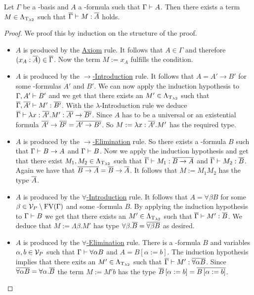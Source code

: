 \begin{lemma}\label{l1}
Let $\Gamma$ be a \SysP-basis and $A$ a \SysP-formula such that $\Gamma\vdash A$. Then there exists a term $M\in\Lambda_{\text{T}_{\lambda2}}$ such that $\overline{\Gamma}\vdash M:\overline{A}$ holds.
\end{lemma}
\begin{proof}
We proof this by induction on the structure of the proof. %

\begin{itemize}
	\item[] $A$ is produced by the \underline{Axiom} rule. It follows that $A\in\Gamma$ and therefore $(x_A:\overline{A})\in\overline{\Gamma}$. Now the term $M:=x_A$ fulfills the condition.
	
	\item[] $A$ is produced by the \underline{$\rightarrow$-Introduction} rule. It follows that $A=A'\to B'$ for some \SysP-formulas $A'$ and $B'$. We can now apply the induction hypothesis to $\Gamma,A'\vdash B'$ and we get that there exists an $M'\in\Lambda_{\text{T}_{\lambda2}}$ such that $\overline{\Gamma},\overline{A'}\vdash M':\overline{B'}$. With the $\lambda$-Introduction rule we deduce $\overline{\Gamma}\vdash \lambda x:\overline{A'}.M':\overline{A'}\to\overline{B'}$. Since $A$ has to be a universal or an existential formula $\overline{A'}\to\overline{B'}=\overline{A'\to B'}$. So $M:=\lambda x:\overline{A'}.M'$ has the required type.
	
	\item[] $A$ is produced by the \underline{$\rightarrow$-Elimination} rule. So there exists a \SysP-formula $B$ such that $\Gamma\vdash B\to A$ and $\Gamma\vdash B$. Now we apply the induction hypothesis and get that there exist $M_1,M_2\in\Lambda_{\text{T}_{\lambda2}}$ such that $\overline{\Gamma}\vdash M_1:\overline{B\to A}$ and $\overline{\Gamma}\vdash M_2:\overline{B}$. Again we have that $\overline{B\to A}=\overline{B}\to\overline{A}$. It follows that $M:=M_1M_2$ has the type $\overline{A}$.
	
	\item[] $A$ is produced by the \underline{$\forall$-Introduction} rule. It follows that $A=\forall\beta B$ for some $\beta\in\mathcal{V}_P\setminus\text{FV}(\Gamma)$ and some \SysP-formula $B$. By applying the induction hypothesis to $\Gamma\vdash B$ we get that there exists an $M'\in\Lambda_{\text{T}_{\lambda2}}$ such that $\overline{\Gamma}\vdash M':\overline{B}$. We deduce that $M:=\Lambda\beta.M'$ has type $\forall\beta.\overline{B}=\overline{\forall\beta B}$ as desired. 
	
	\item[] $A$ is produced by the \underline{$\forall$-Elimination} rule. There is a \SysP-formula $B$ and variables $\alpha,b\in\mathcal{V}_P$ such that $\Gamma\vdash\forall\alpha B$ and $A=B\left[\alpha:=b\right]$. The induction hypothesis implies that there exits an $M'\in\Lambda_{\text{T}_{\lambda2}}$ such that $\overline{\Gamma}\vdash M':\overline{\forall\alpha B}$. Since $\overline{\forall\alpha B}=\forall\alpha.\overline{B}$ the term $M:=M'b$ has the type $\overline{B}\left[\alpha:=b\right]=\overline{B\left[\alpha:=b\right]}$.
\end{itemize}
\end{proof}

